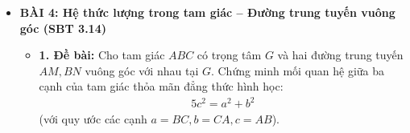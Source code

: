 \documentclass[12pt,a4paper]{article}
\begin{document}
\begin{itemize}
\begin{itemize}
\begin{itemize}
            \item \textit{Bước 2: Thu gọn vế trái hệ thức ban đầu}\\
            Xen điểm cố định $K$ vừa dựng vào vế trái:
            \begin{align*}
                \vec{MA} + 2\vec{MB} + 3\vec{MC} &= (\vec{MK} + \vec{KA}) + 2(\vec{MK} + \vec{KB}) + 3(\vec{MK} + \vec{KC}) \\
                &= 6\vec{MK} + (\vec{KA} + 2\vec{KB} + 3\vec{KC}) \\
                &= 6\vec{MK} + \vec{0} = 6\vec{MK}
            \end{align*}
            Do đó:
            \begin{align*}
                \left|\vec{MA} + 2\vec{MB} + 3\vec{MC}\right| = \left|6\vec{MK}\right| = 6MK
            \end{align*}

            \item \textit{Bước 3: Xác định quỹ đạo hình học của $M$}\\
            Thay kết quả thu gọn vào phương trình ban đầu:
            \begin{align*}
                6MK = BC \Longleftrightarrow MK = \frac{BC}{6}
            \end{align*}
            Vì $K$ là điểm cố định và độ dài $BC$ không đổi, khoảng cách từ $M$ tới điểm $K$ luôn bằng một hằng số dương $R = \frac{BC}{6}$.
        \end{itemize}
        \textbf{Kết luận:} Tập hợp điểm $M$ là đường tròn tâm $K$ (với $K$ là trung điểm đoạn $IC$, và $I$ là điểm thuộc cạnh $AB$ thỏa mãn $IA = 2IB$), bán kính $R = \frac{BC}{6}$.
    \end{itemize}

    \vspace{4mm}

    \item \textbf{BÀI 4: Hệ thức lượng trong tam giác -- Đường trung tuyến vuông góc (SBT 3.14)}
    \begin{itemize}
        \item \textbf{1. Đề bài:}
        Cho tam giác $ABC$ có trọng tâm $G$ và hai đường trung tuyến $AM, BN$ vuông góc với nhau tại $G$. Chứng minh mối quan hệ giữa ba cạnh của tam giác thỏa mãn đẳng thức hình học:
        \begin{align*}
            5c^2 = a^2 + b^2
        \end{align*}
        (với quy ước các cạnh $a = BC, b = CA, c = AB$).


\end{itemize}
\end{itemize}
\end{document}

